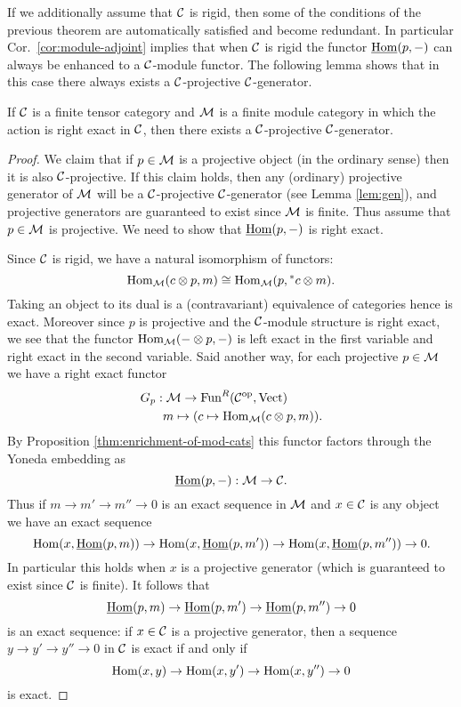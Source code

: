 \documentclass{amsart}
\begin{document}
If we additionally assume that $\mathcal C$ is rigid, then some of the conditions of the previous theorem are automatically satisfied and become redundant. In particular Cor.~\ref{cor:module-adjoint} implies that when $\mathcal C$ is rigid the functor $\operatorname{\underline{Hom}}(p,-)$ can always be enhanced to a $\mathcal C$-module functor.  The following lemma shows that in this case there always exists a $\mathcal C$-projective $\mathcal C$-generator.  
\begin{lemma}{\cite[\S 2.11]{EGNO}} \label{lma:Enough_C-projs}
	If $\mathcal C$ is a finite tensor category and $\mathcal M$ is a finite module category in which the action is right exact in $\mathcal C$, then there exists a $\mathcal C$-projective $\mathcal C$-generator.
\end{lemma}   
\begin{proof}
	We claim that if $p \in \mathcal M$ is a projective object (in the ordinary sense) then it is also $\mathcal C$-projective. If this claim holds, then any (ordinary) projective generator of $\mathcal M$ will be a $\mathcal C$-projective $\mathcal C$-generator (see Lemma \ref{lem:gen}), and projective generators are guaranteed to exist since $\mathcal M$ is finite. 
	Thus assume that $p \in \mathcal M$ is projective.  We need to show that $\operatorname{\underline{Hom}}(p, -)$ is right exact. 
	
	Since $\mathcal C$ is rigid, we have a natural isomorphism of functors:
\begin{equation*}
	\operatorname{Hom}_{\mathcal M}(c \otimes p, m) \cong \operatorname{Hom}_{\mathcal M}(p, {}^*c \otimes m).
\end{equation*}
Taking an object to its dual is a (contravariant) equivalence of categories hence is exact. Moreover since $p$ is projective and the $\mathcal C$-module structure is right exact, we see that the functor $\operatorname{Hom}_{\mathcal M}(- \otimes p, -)$ is left exact in the first variable and right exact in the second variable. Said another way, for each projective $p \in \mathcal M$ we have a right exact functor
\begin{align*}
	G_p: & \; \mathcal M \to \operatorname{Fun}^R(\mathcal C^{\mathrm{op}}, \mathrm{Vect}) \\
	& m \mapsto (c \mapsto \operatorname{Hom}_{\mathcal M}(c \otimes p, m)).
\end{align*} 
By Proposition \ref{thm:enrichment-of-mod-cats} this functor factors through the Yoneda embedding as
\begin{equation*}
	\operatorname{\underline{Hom}}(p, -): \mathcal M \to \mathcal C.
\end{equation*}
Thus if $m \to m' \to m'' \to 0$ is an exact sequence in $\mathcal M$ and $x \in \mathcal C$ is any object we have an exact sequence
\begin{equation*}
	\operatorname{Hom}(x, \operatorname{\underline{Hom}}(p,m)) \to \operatorname{Hom}(x, \operatorname{\underline{Hom}}(p,m')) \to \operatorname{Hom}(x, \operatorname{\underline{Hom}}(p,m'')) \to 0.
\end{equation*}
In particular this holds when $x$ is a projective generator (which is guaranteed to exist since $\mathcal C$ is finite). It follows that 
\begin{equation*}
	\operatorname{\underline{Hom}}(p,m) \to \operatorname{\underline{Hom}}(p,m') \to \operatorname{\underline{Hom}}(p,m'') \to 0
\end{equation*}
is an exact sequence: if $x \in \mathcal C$ is a projective generator, then a sequence $y \to y' \to y'' \to 0$ in $\mathcal C$ is exact if and only if 
\begin{equation*}
	\operatorname{Hom}(x, y) \to \operatorname{Hom}(x, y') \to \operatorname{Hom}(x, y'') \to 0
\end{equation*} 
is exact. 
\end{proof}
\end{document}
